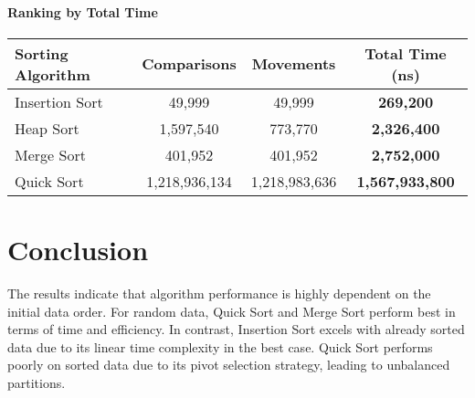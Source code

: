 \documentclass{article}
\begin{document}
\paragraph{Ranking by Total Time}

\begin{longtable}{lccc}
\toprule
\textbf{Sorting Algorithm} & \textbf{Comparisons} & \textbf{Movements} & \textbf{Total Time (ns)} \\
\midrule
Insertion Sort & 49,999        & 49,999        & \textbf{269,200}      \\
Heap Sort      & 1,597,540     & 773,770       & \textbf{2,326,400}    \\
Merge Sort     & 401,952       & 401,952       & \textbf{2,752,000}    \\
Quick Sort     & 1,218,936,134 & 1,218,983,636 & \textbf{1,567,933,800} \\
\bottomrule
\end{longtable}

\section{Conclusion}

The results indicate that algorithm performance is highly dependent on the initial data order. For random data, Quick Sort and Merge Sort perform best in terms of time and efficiency. In contrast, Insertion Sort excels with already sorted data due to its linear time complexity in the best case. Quick Sort performs poorly on sorted data due to its pivot selection strategy, leading to unbalanced partitions.
\end{document}
